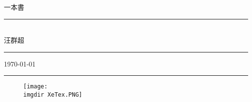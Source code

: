 \documentclass[12pt, a4paper]{book}
\begin{document}
\fontsize{36}{30pt}\selectfont
\thispagestyle{empty}
\begin{flushright}
    {\MB \XeLaTeX 一本書}\\
    \rule{3in}{0.2pt}\\
    \medskip\hfill \Large {\SM 汪群超}\rule{8mm}{0pt}
    \medskip \par\vspace*{-2pt}\hfill \small\today\rule{8mm}{0pt}
\end{flushright}
\bigskip\bigskip\bigskip\bigskip
\begin{figure}[h]
    \centering
        \texttt{[image: \\imgdir XeTex.PNG]}%
    \end{figure}
    
\begin{figure}[H]
    \centering
        \hspace{1.4cm}
\end{figure}
    
\fontsize{12}{22pt}\selectfont

\newpage
\cleardoublepage
\setcounter{tocdepth}{2} %

\tableofcontents
\newpage
\renewcommand{\numberline}[1]{\loflabel~#1\hspace*{1em}}%
\listoffigures %
\newpage
\renewcommand{\numberline}[1]{\lotlabel~#1\hspace*{1em}}%
\listoftables %
\newpage
\ifodd{} \else \thispagestyle{empty}\mbox{}\clearpage\fi %
\setcounter{page}{1} 		%





%
%
%

%
%
%   

  



\printindex 						%
\end{document}

